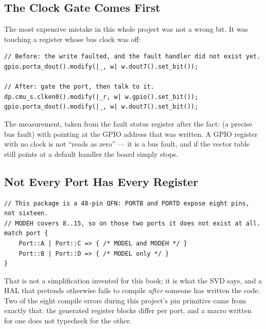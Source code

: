 \subsection{The Clock Gate Comes First}

The most expensive mistake in this whole project was not a wrong bit. It was touching a register
whose bus clock was off:

\begin{verbatim}
// Before: the write faulted, and the fault handler did not exist yet.
gpio.porta_dout().modify(|_, w| w.dout7().set_bit());

// After: gate the port, then talk to it.
dp.cmu_s.clken0().modify(|_r, w| w.gpio().set_bit());
gpio.porta_dout().modify(|_, w| w.dout7().set_bit());
\end{verbatim}

The measurement, taken from the fault status register after the fact:
 (a precise bus fault) with  pointing at the GPIO address
that was written. A GPIO register with no clock is not ``reads as zero'' — it is a bus fault, and if
the vector table still points at a default handler the board simply stops.

\subsection{Not Every Port Has Every Register}

\begin{verbatim}
// This package is a 48-pin QFN: PORTB and PORTD expose eight pins, not sixteen.
// MODEH covers 8..15, so on those two ports it does not exist at all.
match port {
    Port::A | Port::C => { /* MODEL and MODEH */ }
    Port::B | Port::D => { /* MODEL only */ }
}
\end{verbatim}

That is not a simplification invented for this book; it is what the SVD says, and a HAL that
pretends otherwise fails to compile \emph{after} someone has written the code. Two of the eight
compile errors during this project's pin primitive came from exactly that: the generated register
blocks differ per port, and a macro written for one does not typecheck for the other.
